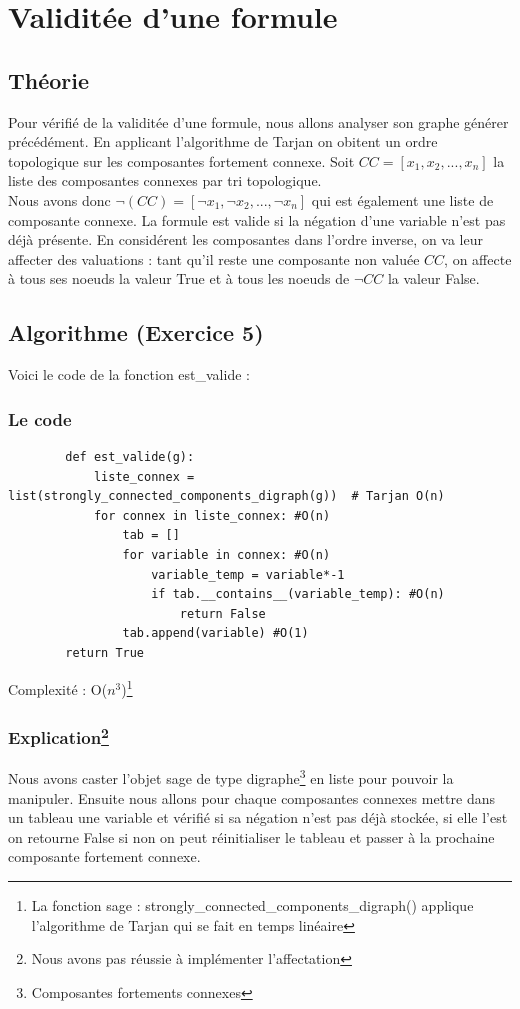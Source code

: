 \documentclass{article}
\begin{document}
    \section{Validitée d'une formule}
    \subsection{Théorie}
    Pour vérifié de la validitée d'une formule, nous allons analyser son graphe générer précédément. En applicant l'algorithme de Tarjan on obitent un ordre topologique sur les composantes fortement connexe. Soit $CC=[x_1,x_2,...,x_n]$ la liste des composantes connexes par tri topologique. \\
    Nous avons donc $\neg{(CC)}=[\neg x_1,\neg x_2,...,\neg x_n]$ qui est également une liste de composante connexe. La formule est valide si la négation d'une variable n'est pas déjà présente. En considérent les composantes dans l’ordre inverse, on va
    leur affecter des valuations : tant qu’il reste une composante non valuée $CC$, on affecte à tous ses noeuds la valeur True et à tous les noeuds de $\neg CC$ la valeur False. 
    \subsection{Algorithme (Exercice 5)}
    Voici le code de la fonction est\_valide : 
    \subsubsection*{Le code}
    \begin{lstlisting}
        def est_valide(g):
            liste_connex = list(strongly_connected_components_digraph(g))  # Tarjan O(n)
            for connex in liste_connex: #O(n)
                tab = []
                for variable in connex: #O(n)
                    variable_temp = variable*-1
                    if tab.__contains__(variable_temp): #O(n)
                        return False
                tab.append(variable) #O(1)
        return True
    \end{lstlisting} 
    Complexité : O($n^3$)\footnote{La fonction sage : strongly\_connected\_components\_digraph() applique l'algorithme de Tarjan qui se fait en temps linéaire }
    \newpage
    \subsubsection*{Explication\footnote{Nous avons pas réussie à implémenter l'affectation}}
    Nous avons caster l'objet sage de type digraphe\footnote{Composantes fortements connexes} en liste pour pouvoir la manipuler. Ensuite nous allons pour chaque composantes connexes mettre dans un tableau une variable et vérifié si sa négation n'est pas déjà stockée, si elle l'est on retourne False si non on peut réinitialiser le tableau et passer à la prochaine composante fortement connexe. 
\end{document}
